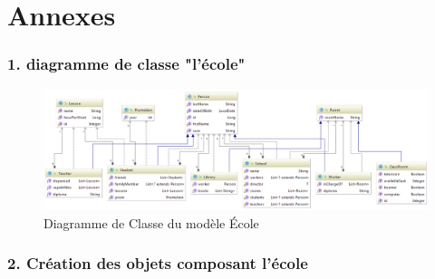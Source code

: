 \documentclass[a4paper,fleqn,12pt]{report}
\begin{document}
\part{Annexes}
\section*{1. diagramme de classe "l'école"}

\begin{figure}
    \includegraphics[scale=0.8]{figures/SchoolDiag.png}
    \caption{Diagramme de Classe du modèle École}
    \label{fig:SchoolDiagram}
\end{figure}

\section*{2. Création des objets composant l'école}
\end{document}

